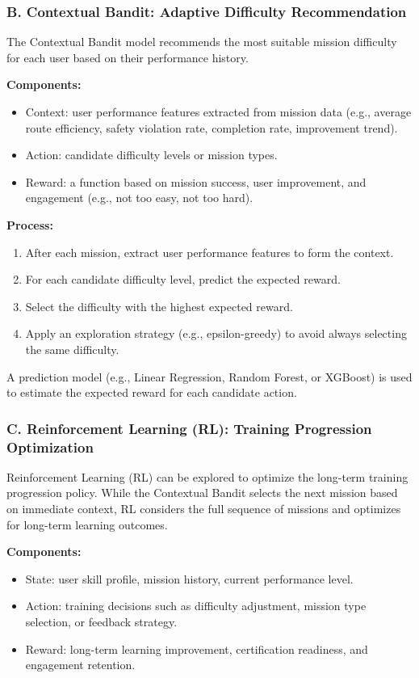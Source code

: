\subsubsection*{B. Contextual Bandit: Adaptive Difficulty Recommendation}

The Contextual Bandit model recommends the most suitable mission difficulty for each user based on their performance history.

\textbf{Components:}
\begin{itemize}
    \item Context: user performance features extracted from mission data (e.g., average route efficiency, safety violation rate, completion rate, improvement trend).
    \item Action: candidate difficulty levels or mission types.
    \item Reward: a function based on mission success, user improvement, and engagement (e.g., not too easy, not too hard).
\end{itemize}

\textbf{Process:}
\begin{enumerate}
    \item After each mission, extract user performance features to form the context.
    \item For each candidate difficulty level, predict the expected reward.
    \item Select the difficulty with the highest expected reward.
    \item Apply an exploration strategy (e.g., epsilon-greedy) to avoid always selecting the same difficulty.
\end{enumerate}

A prediction model (e.g., Linear Regression, Random Forest, or XGBoost) is used to estimate the expected reward for each candidate action.

\subsubsection*{C. Reinforcement Learning (RL): Training Progression Optimization}

Reinforcement Learning (RL) can be explored to optimize the long-term training progression policy. While the Contextual Bandit selects the next mission based on immediate context, RL considers the full sequence of missions and optimizes for long-term learning outcomes.

\textbf{Components:}
\begin{itemize}
    \item State: user skill profile, mission history, current performance level.
    \item Action: training decisions such as difficulty adjustment, mission type selection, or feedback strategy.
    \item Reward: long-term learning improvement, certification readiness, and engagement retention.
\end{itemize}

